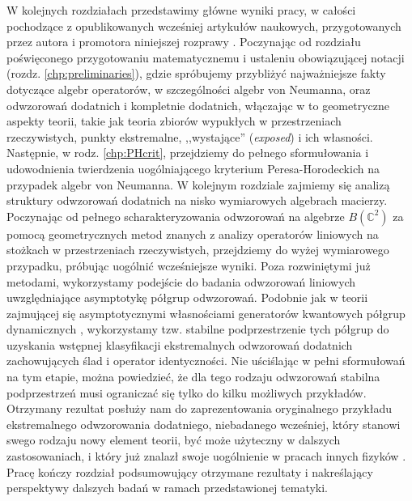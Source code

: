W kolejnych rozdziałach przedstawimy główne wyniki pracy,
w całości pochodzące z opublikowanych wcześniej artykułów naukowych,
przygotowanych przez autora i promotora niniejszej rozprawy
\cite{miller2014horodeckis,miller2015stable,miller2015topology}.
Poczynając od rozdziału poświęconego przygotowaniu matematycznemu i ustaleniu
obowiązującej notacji (rozdz. \ref{chp:preliminaries}),
gdzie spróbujemy przybliżyć najważniejsze fakty dotyczące algebr operatorów,
w szczególności algebr von Neumanna,
oraz odwzorowań dodatnich i kompletnie dodatnich,
włączając w to geometryczne aspekty teorii,
takie jak teoria zbiorów wypukłych w przestrzeniach rzeczywistych,
punkty ekstremalne, ,,wystające'' (\emph{exposed}) i ich własności.
Następnie,
w rodz. \ref{chp:PHcrit},
przejdziemy do pełnego sformułowania i udowodnienia twierdzenia
uogólniającego kryterium Peresa-Horodeckich na przypadek algebr von Neumanna.
W kolejnym rozdziale zajmiemy się analizą struktury odwzorowań dodatnich na
nisko wymiarowych algebrach macierzy.
Poczynając od pełnego scharakteryzowania odwzorowań na algebrze
$B(\mathbb{C}^{2})$ za pomocą geometrycznych metod znanych z analizy
operatorów liniowych na stożkach w przestrzeniach rzeczywistych,
przejdziemy do wyżej wymiarowego przypadku,
próbując uogólnić wcześniejsze wyniki.
Poza rozwiniętymi już metodami,
wykorzystamy podejście do badania odwzorowań
liniowych uwzględniające asymptotykę półgrup odwzorowań.
Podobnie jak w teorii
zajmującej się asymptotycznymi własnościami generatorów kwantowych półgrup
dynamicznych \cite{olkiewicz1999environment},
wykorzystamy tzw. stabilne podprzestrzenie tych półgrup do uzyskania
wstępnej klasyfikacji ekstremalnych odwzorowań dodatnich 
zachowujących ślad i operator identyczności.
Nie uściślając w pełni sformułowań na tym etapie,
można powiedzieć,
że dla tego rodzaju odwzorowań stabilna podprzestrzeń musi ograniczać się
tylko do kilku możliwych przykładów.
Otrzymany rezultat posłuży nam do zaprezentowania oryginalnego przykładu
ekstremalnego odwzorowania dodatniego, niebadanego wcześniej,
który stanowi swego rodzaju nowy element teorii,
być może użyteczny w dalszych zastosowaniach,
i który już znalazł swoje uogólnienie w pracach innych fizyków
\cite{rutkowski2015class}.
Pracę kończy rozdział podsumowujący otrzymane rezultaty i nakreślający
perspektywy dalszych badań w ramach przedstawionej tematyki.

